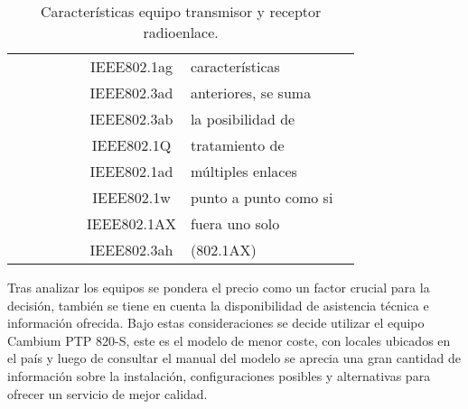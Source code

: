 \begin{table}[H]
\begin{tabular}{|c|c|c|c|c|c|p{11em}|c|}
          &       &       &       &       & IEEE802.1ag & características  &  \\
          &       &       &       &       & IEEE802.3ad & anteriores, se suma  &  \\
          &       &       &       &       & IEEE802.3ab & la posibilidad de &  \\
          &       &       &       &       & IEEE802.1Q & tratamiento de  &  \\
          &       &       &       &       & IEEE802.1ad & múltiples enlaces  &  \\
          &       &       &       &       & IEEE802.1w & punto a punto como si  &  \\
          &       &       &       &       & IEEE802.1AX & fuera uno solo  &  \\
          &       &       &       &       & IEEE802.3ah & (802.1AX) &  \bigstrut[b]\\
    \hline
    \end{tabular}%
    \caption{Características equipo transmisor y receptor radioenlace.}
  \label{tab:caracteristicas-eq}%
\end{table}%






Tras analizar los equipos se pondera el precio como un factor crucial para la decisión, también se tiene en cuenta la disponibilidad de asistencia técnica e información ofrecida. Bajo estas consideraciones se decide utilizar el equipo Cambium PTP 820-S, este es el modelo de menor coste, con locales ubicados en el país y luego de consultar el manual del modelo se aprecia una gran cantidad de información sobre la instalación, configuraciones posibles y alternativas para ofrecer un servicio de mejor calidad.

\newpage